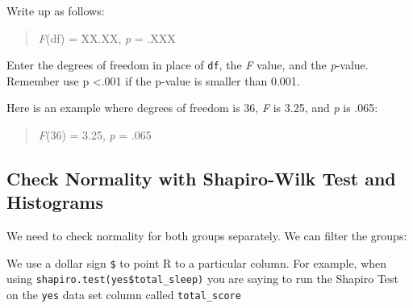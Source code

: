 \documentclass[
]{book}
\newenvironment{Shaded}{\begin{snugshade}}{\end{snugshade}}
\newcommand{\CommentTok}[1]{\textcolor[rgb]{0.56,0.35,0.01}{\textit{#1}}}
\newcommand{\FunctionTok}[1]{\textcolor[rgb]{0.13,0.29,0.53}{\textbf{#1}}}
\newcommand{\NormalTok}[1]{#1}
\newcommand{\OtherTok}[1]{\textcolor[rgb]{0.56,0.35,0.01}{#1}}
\newcommand{\SpecialCharTok}[1]{\textcolor[rgb]{0.81,0.36,0.00}{\textbf{#1}}}
\newcommand{\StringTok}[1]{\textcolor[rgb]{0.31,0.60,0.02}{#1}}
\let\oldsubsection\subsection
\renewcommand{\subsection}{\needspace{3\baselineskip}\oldsubsection}  %
\begin{document}
Write up as follows:

\begin{quote}
\emph{F}(df) = XX.XX, \emph{p} = .XXX
\end{quote}

Enter the degrees of freedom in place of \texttt{df}, the \emph{F} value, and the \emph{p}-value.
Remember use p \textless.001 if the p-value is smaller than 0.001.

Here is an example where degrees of freedom is 36, \emph{F} is 3.25, and \emph{p} is .065:

\begin{quote}
\emph{F}(36) = 3.25, \emph{p} = .065
\end{quote}

\subsection{Check Normality with Shapiro-Wilk Test and Histograms}\label{check-normality-with-shapiro-wilk-test-and-histograms}

We need to check normality for both groups separately. We can filter the groups:

\begin{Shaded}
\end{Shaded}

We use a dollar sign \texttt{\$} to point R to a particular column.
For example, when using \texttt{shapiro.test(yes\$total\_sleep)} you are saying to run the Shapiro Test on the \texttt{yes} data set column called \texttt{total\_score}
\end{document}
